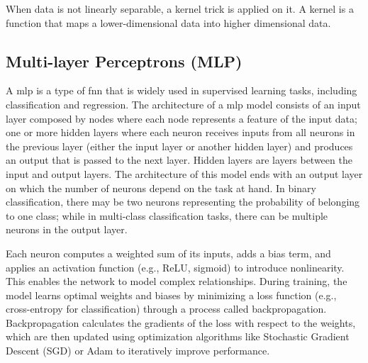 When data is not linearly separable, a kernel trick is applied on it. A kernel is a function that maps a lower-dimensional data into higher dimensional data.

\subsection{Multi-layer Perceptrons (MLP)}
A \acrfull{mlp} is a type of \acrfull{fnn} that is widely used in supervised learning tasks, including classification and regression.
The architecture of a \acrshort{mlp} model consists of an input layer composed by nodes where each node represents a feature of the input data; one or more hidden layers where each neuron receives inputs from all neurons in the previous layer (either the input layer or another hidden layer) and produces an output that is passed to the next layer. Hidden layers are layers between the input and output layers. The architecture of this model ends with an output layer on which the number of neurons depend on the task at hand. In binary classification, there may be two neurons representing the probability of belonging to one class; while in multi-class classification tasks, there can be multiple neurons in the output layer.

Each neuron computes a weighted sum of its inputs, adds a bias term, and applies an activation function (e.g., ReLU, sigmoid) to introduce nonlinearity. This enables the network to model complex relationships. During training, the model learns optimal weights and biases by minimizing a loss function (e.g., cross-entropy for classification) through a process called backpropagation. Backpropagation calculates the gradients of the loss with respect to the weights, which are then updated using optimization algorithms like Stochastic Gradient Descent (SGD) or Adam to iteratively improve performance.